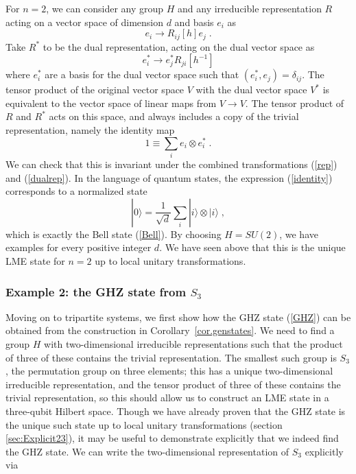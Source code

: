 \documentclass[12pt]{article}
\theoremstyle{definition}
\newcommand{\be}{\begin{equation}}
\newcommand{\ee}{\end{equation}}
\begin{document}
For $n=2$, we can consider any group $H$ and any irreducible representation $R$ acting on a vector space of dimension $d$ and basis $e_i$ as
\be
\label{rep}
e_i \to R_{ij}[h] e_j \; .
\ee
Take $R^*$ to be the dual representation, acting on the dual vector space as
\be
\label{dualrep}
e^*_i \to  e^*_j R_{ji}[h^{-1}]
\ee
where $e^*_i$ are a basis for the dual vector space such that $(e^*_i, e_j) = \delta_{ij}$. The tensor product of the original vector space $V$ with the dual vector space $V^*$ is equivalent to the vector space of linear maps from $V \to V$. The tensor product of $R$ and $R^*$ acts on this space, and always includes a copy of the trivial representation, namely the identity map
\be
\label{identity}
1 \equiv \sum_i e_i  \otimes e_i^* \; .
\ee
We can check that this is invariant under the combined transformations (\ref{rep}) and (\ref{dualrep}). In the language of quantum states, the expression (\ref{identity}) corresponds to a normalized state
\be
|0 \rangle = \frac{1}{\sqrt{d}} \sum_i |i \rangle  \otimes |i \rangle \; ,
\ee
which is exactly the Bell state (\ref{Bell}). By choosing $H = SU(2)$, we have examples for every positive integer $d$. We have seen above that this is the unique LME state for $n=2$ up to local unitary transformations.

\subsubsection*{Example 2: the GHZ state from $S_3$}

Moving on to tripartite systems, we first show how the GHZ state
(\ref{GHZ}) can be obtained from the construction in Corollary~\ref{cor.genstates}. We
need to find a group $H$ with two-dimensional irreducible
representations such that the product of three of these contains the
trivial representation. The smallest such group is $S_3$, the
permutation group on three elements; this has a unique two-dimensional
irreducible representation, and the tensor product of three of these
contains the trivial representation, so this should allow us to
construct an LME state in a three-qubit Hilbert space. Though we have
already proven that the GHZ state is the unique such state up to local
unitary transformations (section \ref{sec:Explicit23}), it may be
useful to demonstrate explicitly that we indeed find the GHZ state. We
can write the two-dimensional representation of $S_3$ explicitly via
\end{document}
